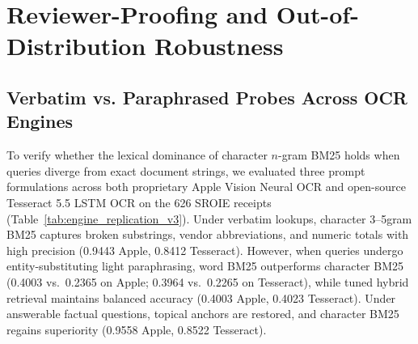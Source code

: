 \documentclass[conference]{IEEEtran}
\begin{document}
\begin{table}[h]
\centering
\small
\caption{Preliminary Synthetic Noise Sweeps, Heterogeneous Corruption ($f_{\text{bad}}$), and Mixed-Intent Routing ($N=600$).}
\label{tab:pilot_sweeps}
\end{table}




\section{Reviewer-Proofing and Out-of-Distribution Robustness}
\label{sec:appendix_reviewer_proofing}

\subsection{Verbatim vs. Paraphrased Probes Across OCR Engines}
To verify whether the lexical dominance of character $n$-gram BM25 holds when queries diverge from exact document strings, we evaluated three prompt formulations across both proprietary Apple Vision Neural OCR and open-source Tesseract 5.5 LSTM OCR on the 626 SROIE receipts (Table~\ref{tab:engine_replication_v3}). Under verbatim lookups, character 3--5gram BM25 captures broken substrings, vendor abbreviations, and numeric totals with high precision (0.9443 Apple, 0.8412 Tesseract). However, when queries undergo entity-substituting light paraphrasing, word BM25 outperforms character BM25 (0.4003 vs.\ 0.2365 on Apple; 0.3964 vs.\ 0.2265 on Tesseract), while tuned hybrid retrieval maintains balanced accuracy (0.4003 Apple, 0.4023 Tesseract). Under answerable factual questions, topical anchors are restored, and character BM25 regains superiority (0.9558 Apple, 0.8522 Tesseract).
\end{document}

